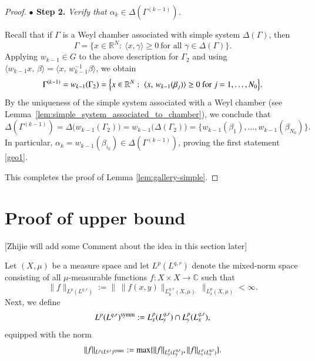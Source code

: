 \documentclass[12pt]{amsart}
\begin{document}
\begin{proof}
{\bf $\bullet$ Step 2.} {\it Verify that $\alpha_k\in\Delta(\Gamma^{(k-1)})$.}

Recall that if $\Gamma$ is a Weyl chamber associated with simple system $\Delta(\Gamma)$, then
\[
\Gamma=\{x\in\mathbb R^N:\ \langle x,\gamma\rangle\ge 0\ \text{for all }\gamma\in\Delta(\Gamma)\}.
\]
Applying $w_{k-1}\in G$ to the above description for $\Gamma_2$ and using
$\langle w_{k-1}x,\,\beta\rangle=\langle x,\,w_{k-1}^{-1}\beta\rangle$, we obtain
\[
\Gamma^{(k-1)}=w_{k-1}(\Gamma_2)
=\Bigl\{x\in\mathbb R^N:\ \langle x,\,w_{k-1}(\beta_j)\rangle\ge 0\ \text{for }j=1,\ldots,N_0\Bigr\}.
\]
By the uniqueness of the simple system associated with a Weyl chamber
(see Lemma~\ref{lem:simple_system_associated_to_chamber}), we conclude that
\[
\Delta(\Gamma^{(k-1)})=\Delta\big(w_{k-1}(\Gamma_2)\big)=w_{k-1}\big(\Delta(\Gamma_2)\big)=\{w_{k-1}(\beta_1),\ldots,w_{k-1}(\beta_{N_0})\}.
\]
In particular, $\alpha_k=w_{k-1}(\beta_{i_k})\in\Delta(\Gamma^{(k-1)})$, proving the first statement \eqref{geo1}.

This completes the proof of Lemma \ref{lem:gallery-simple}.
\end{proof}


\section{Proof of upper bound}
\setcounter{equation}{0}

{\color{red}[Zhijie will add some Comment about the idea in this section later]}

Let $(X,\mu)$ be a measure space and let $L^p(L^{q,r})$ denote the mixed-norm space consisting of all $\mu$-measurable functions $f:X\times X \to \mathbb{C}$ such that
\[
\|f\|_{L^p(L^{q,r})} := \Big\|\, \|f(x,y)\|_{L^{q,r}_y(X,\mu)}\,\Big\|_{L^p_x(X,\mu)} < \infty.
\]
Next, we define
$$L^p(L^{q,r})^{\rm symm}:=L_x^{p}(L_y^{q,r})\cap L_y^p(L_x^{q,r}),$$
equipped with the norm
$$\|f\|_{L^p(L^{q,r})^{\rm symm}}:=\max\{\|f\|_{L_x^{p}(L_y^{q,r})},\|f\|_{L_y^p(L_x^{q,r})}\}.$$
\end{document}
